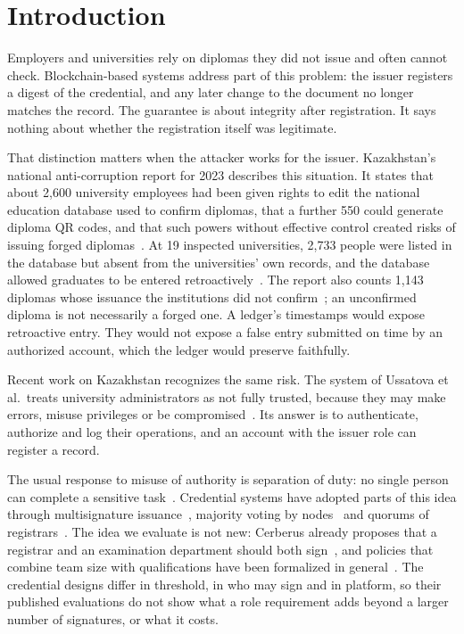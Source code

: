 \section{Introduction}\label{sec:intro}
Employers and universities rely on diplomas they did not issue and often cannot check. Blockchain-based systems address part of this problem: the issuer registers a digest of the credential, and any later change to the document no longer matches the record. The guarantee is about integrity after registration. It says nothing about whether the registration itself was legitimate.

That distinction matters when the attacker works for the issuer. Kazakhstan's national anti-corruption report for 2023 describes this situation. It states that about 2,600 university employees had been given rights to edit the national education database used to confirm diplomas, that a further 550 could generate diploma QR codes, and that such powers without effective control created risks of issuing forged diplomas~\cite{kzreport2023}. At 19 inspected universities, 2,733 people were listed in the database but absent from the universities' own records, and the database allowed graduates to be entered retroactively~\cite{kzreport2023}. The report also counts 1,143 diplomas whose issuance the institutions did not confirm~\cite{kzreport2023}; an unconfirmed diploma is not necessarily a forged one. A ledger's timestamps would expose retroactive entry. They would not expose a false entry submitted on time by an authorized account, which the ledger would preserve faithfully.

Recent work on Kazakhstan recognizes the same risk. The system of Ussatova et al.\ treats university administrators as not fully trusted, because they may make errors, misuse privileges or be compromised~\cite{ussatova2026b}. Its answer is to authenticate, authorize and log their operations, and an account with the issuer role can register a record.

The usual response to misuse of authority is separation of duty: no single person can complete a sensitive task~\cite{ferraiolo1992}. Credential systems have adopted parts of this idea through multisignature issuance~\cite{lone2020}, majority voting by nodes~\cite{sarwar2026} and quorums of registrars~\cite{saramago2021}. The idea we evaluate is not new: Cerberus already proposes that a registrar and an examination department should both sign~\cite{tariq2023}, and policies that combine team size with qualifications have been formalized in general~\cite{li2008}. The credential designs differ in threshold, in who may sign and in platform, so their published evaluations do not show what a role requirement adds beyond a larger number of signatures, or what it costs.

